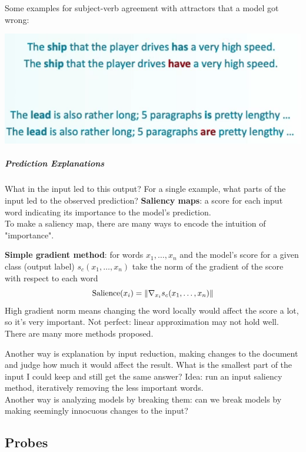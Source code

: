 \documentclass[10pt]{report}
\begin{document}
Some examples for subject-verb agreement with attractors that a model got wrong: %
\begin{center}
	\includegraphics[scale=0.5]{79.png}
\end{center}
\subparagraph{Prediction Explanations} What in the input led to this output? For a single example, what parts of the input led to the observed prediction? \textbf{Saliency maps}: a score for each input word indicating its importance to the model's prediction.\\
To make a saliency map, there are many ways to encode the intuition of "importance".\begin{list}{}{}
	\item \textbf{Simple gradient method}: for words $x_1,\ldots,x_n$ and the model's score for a given class (output label) $s_c(x_1,\ldots,x_n)$ take the norm of the gradient of the score with respect to each word
	$$\hbox{Salience}(x_i)=\|\nabla_{x_i}s_c(x_1,\ldots,x_n)\|$$
	High gradient norm means changing the word locally would affect the score a lot, so it's very important. Not perfect: linear approximation may not hold well. There are many more methods proposed.
\end{list}
Another way is explanation by input reduction, making changes to the document and judge how much it would affect the result. What is the smallest part of the input I could keep and still get the same answer? Idea: run an input saliency method, iteratively removing the less important words.\\
Another way is analyzing models by breaking them: can we break models by making seemingly innocuous changes to the input?
\subsection{Probes}
\end{document}
